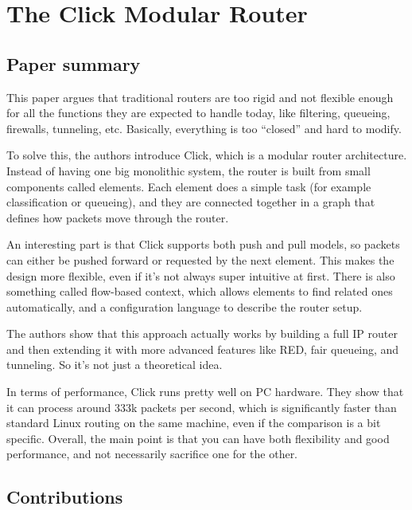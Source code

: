 \documentclass[a4paper, 12pt]{article}
\begin{document}
\section*{The Click Modular Router}
\subsection{Paper summary}

This paper argues that traditional routers are too rigid and not flexible enough for all the functions they are expected to handle today, like filtering, queueing, firewalls, tunneling, etc. Basically, everything is too ``closed'' and hard to modify.

To solve this, the authors introduce Click, which is a modular router architecture. Instead of having one big monolithic system, the router is built from small components called elements. Each element does a simple task (for example classification or queueing), and they are connected together in a graph that defines how packets move through the router.

An interesting part is that Click supports both push and pull models, so packets can either be pushed forward or requested by the next element. This makes the design more flexible, even if it's not always super intuitive at first. There is also something called flow-based context, which allows elements to find related ones automatically, and a configuration language to describe the router setup.

The authors show that this approach actually works by building a full IP router and then extending it with more advanced features like RED, fair queueing, and tunneling. So it's not just a theoretical idea.

In terms of performance, Click runs pretty well on PC hardware. They show that it can process around 333k packets per second, which is significantly faster than standard Linux routing on the same machine, even if the comparison is a bit specific. Overall, the main point is that you can have both flexibility and good performance, and not necessarily sacrifice one for the other.

\subsection{Contributions}
\end{document}
